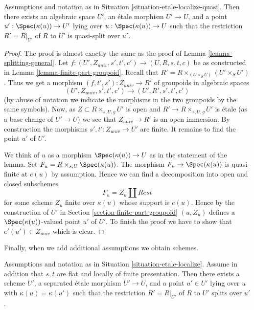 \begin{lemma}
\label{lemma-quasi-splitting-general}
Assumptions and notation as in
Situation \ref{situation-etale-localize-quasi}.
Then there exists an algebraic space $U'$, an \'etale morphism
$U' \to U$, and a point $u' : \Spec(\kappa(u)) \to U'$
lying over $u : \Spec(\kappa(u)) \to U$
such that the restriction $R' = R|_{U'}$ of $R$ to $U'$
is quasi-split over $u'$.
\end{lemma}

\begin{proof}
The proof is almost exactly the same as the proof of
Lemma \ref{lemma-splitting-general}.
Let $f : (U', Z_{univ}, s', t', c') \to (U, R, s, t, c)$ be as constructed in
Lemma \ref{lemma-finite-part-groupoid}.
Recall that $R' = R \times_{(U \times_S U)} (U' \times_S U')$.
Thus we get a morphism $(f, t', s') : Z_{univ} \to R'$ of groupoids
in algebraic spaces
$$
(U', Z_{univ}, s', t', c') \to (U', R', s', t', c')
$$
(by abuse of notation we indicate the morphisms in the two groupoids
by the same symbols). Now, as $Z \subset R \times_{s, U, g} U'$ is open
and $R' \to R \times_{s, U, g} U'$ is \'etale (as a base change
of $U' \to U$) we see that $Z_{univ} \to R'$ is an open immersion.
By construction the morphisms $s', t' : Z_{univ} \to U'$ are finite.
It remains to find the point $u'$ of $U'$.

\medskip\noindent
We think of $u$ as a morphism $\Spec(\kappa(u)) \to U$ as in
the statement of the lemma. Set $F_u = R \times_{s, U} \Spec(\kappa(u))$.
The morphism $F_u \to \Spec(\kappa(u))$ is quasi-finite at $e(u)$
by assumption. Hence we can find a decomposition into open and closed
subschemes
$$
F_u = Z_u \amalg Rest
$$
for some scheme $Z_u$ finite over $\kappa(u)$ whose support is $e(u)$.
Hence by the construction of $U'$ in
Section \ref{section-finite-part-groupoid}
$(u, Z_u)$ defines a $\Spec(\kappa(u))$-valued
point $u'$ of $U'$. To finish the proof we have to show that
$e'(u') \in Z_{univ}$ which is clear.
\end{proof}

\noindent
Finally, when we add additional assumptions we obtain schemes.

\begin{lemma}
\label{lemma-splitting-scheme}
Assumptions and notation as in
Situation \ref{situation-etale-localize}.
Assume in addition that $s, t$ are flat and locally of finite presentation.
Then there exists a scheme $U'$, a separated \'etale morphism
$U' \to U$, and a point $u' \in U'$
lying over $u$ with $\kappa(u) = \kappa(u')$
such that the restriction $R' = R|_{U'}$ of $R$ to $U'$
splits over $u'$.
\end{lemma}


